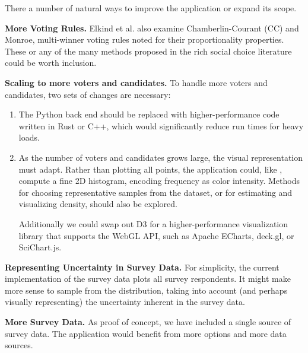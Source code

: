 
There a number of natural ways to improve the application or expand its scope.

\textbf{More Voting Rules.}
Elkind et al. \cite{elkind} also examine
Chamberlin-Courant (CC) and Monroe,
multi-winner voting rules noted for their proportionality properties.
These or any of the many methods proposed in the rich social choice
literature could be worth inclusion.



\textbf{Scaling to more voters and candidates.}
To handle more voters and candidates, two sets of changes are necessary:
\begin{enumerate}
  \item
The Python back end should be replaced with higher-performance code written in Rust or C++,
which would significantly reduce run times for heavy loads.

\item
  As the number of voters and candidates grows large, the visual representation must adapt.
  Rather than plotting all points, the application could, like \cite{elkind},
  compute a fine 2D histogram, encoding frequency as color intensity.
  Methods for choosing representative samples from the dataset,
  or for estimating and visualizing density, should also be explored.

  Additionally we could swap out D3
  for a higher-performance visualization library
  that supports the WebGL API,
  such as Apache ECharts, deck.gl, or SciChart.js.

\end{enumerate}

\textbf{Representing Uncertainty in Survey Data.}
For simplicity, the current implementation of the survey data
plots all survey respondents. It might make more sense to sample
from the distribution, taking into account (and perhaps visually representing)
the uncertainty inherent in the survey data.

\textbf{More Survey Data.}
As proof of concept, we have included a single source of survey data.
The application would benefit from more options and more data sources.

